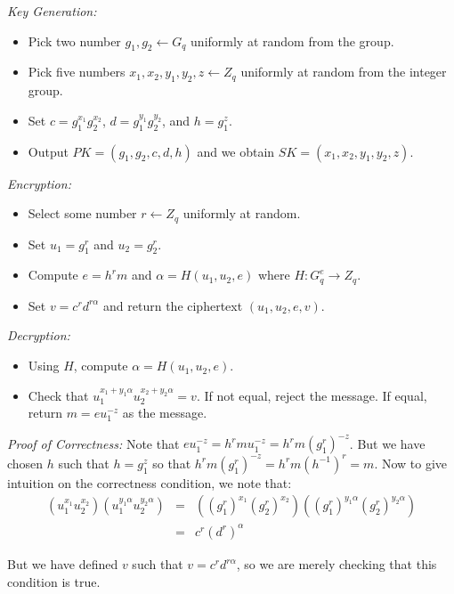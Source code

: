 \documentclass[psamsfonts]{amsart}
\begin{document}
\emph{Key Generation:}
\begin{itemize}
  \item Pick two number $g_1, g_2 \leftarrow G_q$ uniformly at random from the group.
  \item Pick five numbers $x_1, x_2, y_1, y_2, z \leftarrow Z_q$ uniformly at random from the integer group.
  \item Set $c = g_1^{x_1} g_2^{x_2}$, $d = g_1^{y_1} g_2^{y_2}$, and $h = g_1^z$.
  \item Output $PK = (g_1, g_2, c, d, h)$ and we obtain $SK = (x_1, x_2, y_1, y_2, z)$.
\end{itemize}

\emph{Encryption:}
\begin{itemize}
  \item Select some number $r \leftarrow Z_q$ uniformly at random.
  \item Set $u_1 = g_1^{r}$ and $u_2 = g_2^{r}$.
  \item Compute $e = h^r m$ and $\alpha = H(u_1, u_2, e)$ where $H: G_q^{e} \to Z_q$.
  \item Set $v = c^r d^{r \alpha}$ and return the ciphertext $(u_1, u_2, e, v)$.
\end{itemize}

\emph{Decryption:}
\begin{itemize}
  \item Using $H$, compute $\alpha = H(u_1, u_2, e)$.
  \item Check that $u_1^{x_1 + y_1 \alpha} u_2^{x_2 + y_2 \alpha} = v$. If not equal, reject the message. If equal, return $m = e u_1^{-z}$ as the message.
\end{itemize}

\emph{Proof of Correctness:} Note that $e u_1^{-z} = h^r m u_1^{-z} = h^r m (g_1^{r})^{-z}$. But we have chosen $h$ such that $h = g_1^z$ so that $h^r m (g_1^{r})^{-z} = h^r m (h^{-1})^r = m$. Now to give intuition on the correctness condition, we note that:
\begin{eqnarray}
  (u_1^{x_1} u_2^{x_2})(u_1^{y_1 \alpha} u_2^{y_2 \alpha}) &=& ((g_1^{r})^{x_1}(g_2^{r})^{x_2})((g_1^{r})^{y_1 \alpha} (g_2^{r})^{y_2 \alpha}) \\
                                                           &=& c^r (d^r)^\alpha
\end{eqnarray}

But we have defined $v$ such that $v = c^r d^{r \alpha}$, so we are merely checking that this condition is true.
\end{document}
